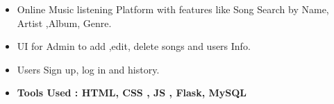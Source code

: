 \documentclass[10pt,a4paper,ragged2e,withhyper]{altacv}
\begin{document}
\begin{paracol}{2}







\begin{itemize}
\item Online Music listening Platform with features like Song Search by Name, Artist ,Album, Genre.
\item  UI for Admin to add ,edit, delete songs and users Info.
\item Users Sign up, log in and history.
\item \color{emphasis}\textbf{Tools Used : HTML, CSS , JS , Flask, MySQL}
\end{itemize}


\end{paracol}
\end{document}
